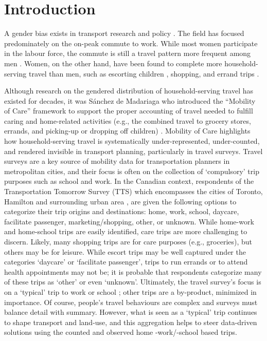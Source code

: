 \documentclass[
  authoryear,
  preprint,
  3p]{elsarticle}
\begin{document}
\section{Introduction}\label{introduction}

A gender bias exists in transport research and policy
\citep{sanchezdemadariagaMobilityCareIntroducing2013, lawWomenTransportNew1999, siemiatyckiGenderedProductionInfrastructure2020}.
The field has focused predominately on the on-peak commute to work.
While most women participate in the labour force, the commute is still a
travel pattern more frequent among men
\citep{sanchezdemadariagaMobilityCareIntroducing2013}. Women, on the
other hand, have been found to complete more household-serving travel
than men, such as escorting children
\citep{craigGenderMobilityParental2019, taylorWhatExplainsGender2015, hanTaskAllocationGender2019, mcdonaldExploratoryAnalysisChildren2006},
shopping, and errand trips
\citep{taylorWhatExplainsGender2015, rootWomenTravelIdea2000, sweetGenderDifferencesRole2016}.

Although research on the gendered distribution of household-serving
travel has existed for decades, it was Sánchez de Madariaga who
introduced the ``Mobility of Care'' framework to support the proper
accounting of travel needed to fulfill caring and home-related
activities (e.g., the combined travel to grocery stores, errands, and
picking-up or dropping off children)
\citep{sanchezdemadariagaMobilityCareIntroducing2013}. Mobility of Care
highlights how household-serving travel is systematically
under-represented, under-counted, and rendered invisible in transport
planning, particularly in travel surveys. Travel surveys are a key
source of mobility data for transportation planners in metropolitan
cities, and their focus is often on the collection of `compulsory' trip
purposes such as school and work. In the Canadian context, respondents
of the Transportation Tomorrow Survey (TTS) which encompasses the cities
of Toronto, Hamilton and surrounding urban area
\citep{transportationtomorrowsurvey2018}, are given the following
options to categorize their trip origins and destinations: home, work,
school, daycare, facilitate passenger, marketing/shopping, other, or
unknown. While home-work and home-school trips are easily identified,
care trips are more challenging to discern. Likely, many shopping trips
are for care purposes (e.g., groceries), but others may be for leisure.
While escort trips may be well captured under the categories `daycare'
or `facilitate passenger', trips to run errands or to attend health
appointments may not be; it is probable that respondents categorize many
of these trips as `other' or even `unknown'. Ultimately, the travel
survey's focus is on a `typical' trip to work or school
\citep{transportationtomorrowsurvey2018}; other trips are a by-product,
minimized in importance. Of course, people's travel behaviours are
complex and surveys must balance detail with summary. However, what is
seen as a `typical' trip continues to shape transport and land-use, and
this aggregation helps to steer data-driven solutions using the counted
and observed home -work/-school based trips.
\end{document}
